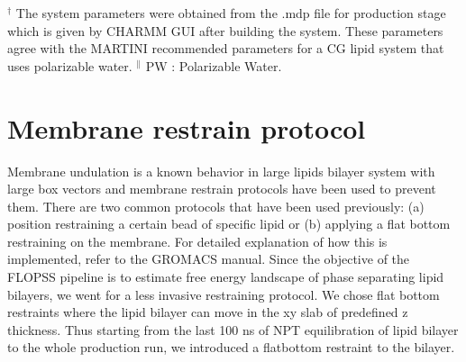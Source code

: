 \documentclass[10pt]{article}
\begin{document}
$^\dagger$ The system parameters were obtained from the .mdp file for production stage which is given by CHARMM GUI\cite{Qi2015}
after building the system. These parameters agree with the MARTINI recommended parameters\cite{DeJong2016} for a CG lipid system that uses polarizable water\cite{Yesylevskyy2010}.
$^{\parallel}$ PW : Polarizable Water.

\section*{Membrane restrain protocol}

Membrane undulation is a known behavior in large lipids bilayer system with large box vectors and membrane restrain protocols have been used to prevent them\cite{Ingolfsson2014,Lin2019,Su2020}.
There are two common protocols that have been used previously: (a) position restraining a certain bead of specific lipid or
(b) applying a flat bottom restraining on the membrane.
For detailed explanation of how this is implemented, refer to the GROMACS manual\cite{GromacsManual}.
Since the objective of the FLOPSS pipeline is to estimate free energy landscape of phase separating lipid bilayers,
we went for a less invasive restraining protocol.
We chose flat bottom restraints where the lipid bilayer can move in the xy slab of predefined z thickness.
Thus starting from the last 100 ns of NPT equilibration of lipid bilayer to the whole production run,
we introduced a flatbottom restraint to the bilayer.
\end{document}
